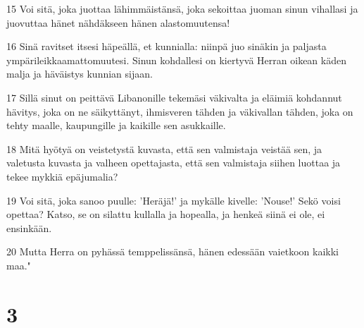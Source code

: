 \par 15 Voi sitä, joka juottaa lähimmäistänsä, joka sekoittaa juoman sinun vihallasi ja juovuttaa hänet nähdäkseen hänen alastomuutensa!
\par 16 Sinä ravitset itsesi häpeällä, et kunnialla: niinpä juo sinäkin ja paljasta ympärileikkaamattomuutesi. Sinun kohdallesi on kiertyvä Herran oikean käden malja ja häväistys kunnian sijaan.
\par 17 Sillä sinut on peittävä Libanonille tekemäsi väkivalta ja eläimiä kohdannut hävitys, joka on ne säikyttänyt, ihmisveren tähden ja väkivallan tähden, joka on tehty maalle, kaupungille ja kaikille sen asukkaille.
\par 18 Mitä hyötyä on veistetystä kuvasta, että sen valmistaja veistää sen, ja valetusta kuvasta ja valheen opettajasta, että sen valmistaja siihen luottaa ja tekee mykkiä epäjumalia?
\par 19 Voi sitä, joka sanoo puulle: 'Heräjä!' ja mykälle kivelle: 'Nouse!' Sekö voisi opettaa? Katso, se on silattu kullalla ja hopealla, ja henkeä siinä ei ole, ei ensinkään.
\par 20 Mutta Herra on pyhässä temppelissänsä, hänen edessään vaietkoon kaikki maa."

\chapter{3}

